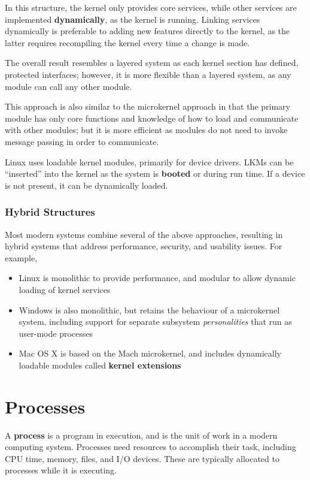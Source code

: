 \documentclass{article}
\begin{document}
In this structure, the kernel only provides core services, while other
services are implemented \textbf{dynamically}, as the kernel is
running. Linking services dynamically is preferable to adding new
features directly to the kernel, as the latter requires recompiling the
kernel every time a change is made.

The overall result resembles a layered system as each kernel section
has defined, protected interfaces; however, it is more flexible than a
layered system, as any module can call any other module.

This approach is also similar to the microkernel approach in that the
primary module has only core functions and knowledge of how to load and
communicate with other modules; but it is more efficient as modules do
not need to invoke message passing in order to communicate.

Linux uses loadable kernel modules, primarily for device drivers. LKMs
can be ``inserted'' into the kernel as the system is \textbf{booted} or
during run time. If a device is not present, it can be dynamically
loaded.
\subsubsection{Hybrid Structures}
Most modern systems combine several of the above approaches, resulting
in hybrid systems that address performance, security, and usability
issues. For example,
\begin{itemize}
    \item Linux is monolithic to provide performance, and modular to
          allow dynamic loading of kernel services
    \item Windows is also monolithic, but retains the behaviour of a
          microkernel system, including support for separate subsystem
          \textit{personalities} that run as user-mode processes
    \item Mac OS X is based on the Mach microkernel, and includes
          dynamically loadable modules called \textbf{kernel
          extensions}
\end{itemize}
\section{Processes}
A \textbf{process} is a program in execution, and is the unit of work
in a modern computing system. Processes need resources to accomplish
their task, including CPU time, memory, files, and I/O devices. These
are typically allocated to processes while it is executing.
\end{document}

